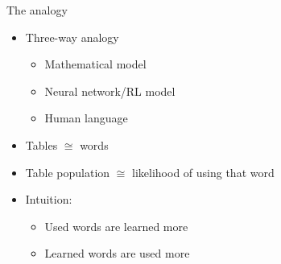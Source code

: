 \documentclass{beamer}
\begin{document}
\begin{frame}{The analogy}
    \begin{itemize}
        \item Three-way analogy
            \begin{itemize}
                \item Mathematical model
                \item Neural network/RL model
                \item Human language
            \end{itemize}
        \item Tables $\cong$ words
        \item Table population $\cong$ likelihood of using that word
        \item Intuition:
        \begin{itemize}
            \item Used words are learned more
            \item Learned words are used more
        \end{itemize}
    \end{itemize}
\end{frame}

% 

\end{document}
